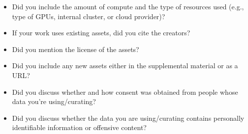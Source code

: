 \begin{itemize}
    
    \item
    Did you include the amount of compute and the type of resources used (e.g., type of GPUs, internal cluster, or cloud provider)?
    
    
    \item
    If your work uses existing assets, did you cite the creators?
    
    
    \item
    Did you mention the license of the assets?
    
    
    \item
    Did you include any new assets either in the supplemental material or as a URL?
    
    
    \item
    Did you discuss whether and how consent was obtained from people whose data you're using/curating?
    
    
    \item
    Did you discuss whether the data you are using/curating contains personally identifiable information or offensive content?
    
\end{itemize}